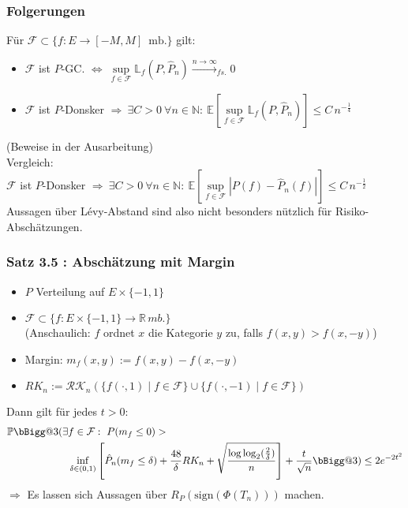 \documentclass{beamer}
\makeatletter
\newcommand{\R}{\mathbb{R}} %
\newcommand{\N}{\mathbb{N}} %
\newcommand{\E}{\mathbb{E}} %
\newcommand{\F}{\mathcal{F}}
\newcommand{\vast}{\bBigg@{3}}
\makeatother
\begin{document}
	\begin{frame}
		\frametitle{Folgerungen}
		Für $\F \subset \{f : E \rightarrow [-M,M] \, \text{ mb.}\}$ gilt:
		\begin{itemize}
			\item $\F$ ist $P$-GC. $\Leftrightarrow \ \sup\limits_{f \in \F} \mathbb{L}_f(P,\hat{P}_n) \xrightarrow{n \rightarrow \infty}_{fs.} 0$
			\item $\F$ ist $P$-Donsker $\Rightarrow \ \exists C>0 \ \forall n \in \N : \ \E\left[ \sup\limits_{f \in \F} \mathbb{L}_f(P,\hat{P}_n) \right] \leq C \, n^{-\frac{1}{4}}$
		\end{itemize}
		(Beweise in der Ausarbeitung)\\
		\hfill\break
		\pause
		Vergleich:\\
		$\F$ ist $P$-Donsker $\Rightarrow \ \exists C>0 \ \forall n \in \N : \ \E\left[ \sup\limits_{f \in \F} |P(f)-\hat{P}_n(f)| \right] \leq C \, n^{-\frac{1}{2}}$\\
		Aussagen über L\'evy-Abstand sind also nicht besonders nützlich für Risiko-Abschätzungen.
	\end{frame}

	\begin{frame}
		\frametitle{Satz 3.5 : Abschätzung mit Margin}
		\begin{itemize}
			\item $P$ Verteilung auf $E \times \{-1,1\}$
			\item $\F \subset \{ f: E \times \{-1,1\} \rightarrow \R \, mb. \}$\\
			(Anschaulich: $f$ ordnet $x$ die Kategorie $y$ zu, falls $f(x,y) > f(x,-y)$)
			\item Margin: $m_f(x,y) := f(x,y) - f(x,-y)$
			\item $RK_n := \mathcal{RK}_n\left( \{f(\cdot,1) \mid f \in \F \} \cup \{f(\cdot,-1) \mid f \in \F \} \right)$
		\end{itemize}
		Dann gilt für jedes $t >0:$ 
		{\small
		\begin{align*}
		\mathbb{P}\vast( \exists & f \in \F : \ P(m_f \leq 0) > \\
		& \inf\limits_{\delta \in (0,1)}\left[ \hat{P}_n(m_f \leq \delta) + \frac{48}{\delta} RK_n + \sqrt{\frac{\log\log_2(\frac{2}{\delta})}{n}} \right] + \frac{t}{\sqrt{n}} \vast) \leq 2 e^{-2t^2}
		\end{align*}
		}
		\hfill\break
		\pause
		$\Rightarrow$ Es lassen sich Aussagen über $R_P(\text{sign}(\Phi(T_n)))$ machen.
	\end{frame}
\end{document}
